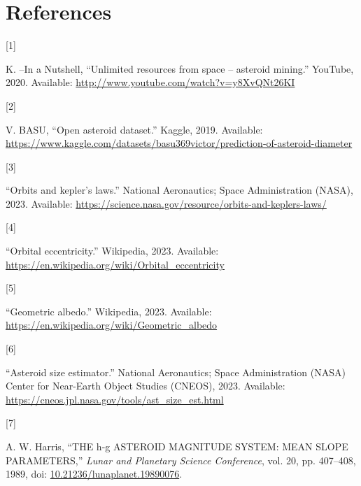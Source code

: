 \documentclass[
]{article}
\newlength{\cslhangindent}
\newlength{\csllabelwidth}
\newlength{\cslentryspacingunit} %
\newenvironment{CSLReferences}[2] %
 {%
  \setlength{\parindent}{0pt}
  \ifodd #1
  \let\oldpar\par
  \def\par{\hangindent=\cslhangindent\oldpar}
  \fi
  \setlength{\parskip}{#2\cslentryspacingunit}
 }%
 {}
\newcommand{\CSLLeftMargin}[1]{\parbox[t]{\csllabelwidth}{#1}}
\newcommand{\CSLRightInline}[1]{\parbox[t]{\linewidth - \csllabelwidth}{#1}\break}
\begin{document}
\hypertarget{references}{%
\section*{References}\label{references}}

\hypertarget{refs}{}
\begin{CSLReferences}{0}{0}
\leavevmode{}%
\CSLLeftMargin{{[}1{]} }%
\CSLRightInline{K. --In a Nutshell, {``Unlimited resources from space --
asteroid mining.''} YouTube, 2020. Available:
\url{http://www.youtube.com/watch?v=y8XvQNt26KI}}

\leavevmode{}%
\CSLLeftMargin{{[}2{]} }%
\CSLRightInline{V. BASU, {``Open asteroid dataset.''} Kaggle, 2019.
Available:
\url{https://www.kaggle.com/datasets/basu369victor/prediction-of-asteroid-diameter}}

\leavevmode{}%
\CSLLeftMargin{{[}3{]} }%
\CSLRightInline{{``Orbits and kepler's laws.''} National Aeronautics;
Space Administration (NASA), 2023. Available:
\url{https://science.nasa.gov/resource/orbits-and-keplers-laws/}}

\leavevmode{}%
\CSLLeftMargin{{[}4{]} }%
\CSLRightInline{{``Orbital eccentricity.''} Wikipedia, 2023. Available:
\url{https://en.wikipedia.org/wiki/Orbital_eccentricity}}

\leavevmode{}%
\CSLLeftMargin{{[}5{]} }%
\CSLRightInline{{``Geometric albedo.''} Wikipedia, 2023. Available:
\url{https://en.wikipedia.org/wiki/Geometric_albedo}}

\leavevmode{}%
\CSLLeftMargin{{[}6{]} }%
\CSLRightInline{{``Asteroid size estimator.''} National Aeronautics;
Space Administration (NASA) Center for Near-Earth Object Studies
(CNEOS), 2023. Available:
\url{https://cneos.jpl.nasa.gov/tools/ast_size_est.html}}

\leavevmode{}%
\CSLLeftMargin{{[}7{]} }%
\CSLRightInline{A. W. Harris, {``THE h-g ASTEROID MAGNITUDE SYSTEM: MEAN
SLOPE PARAMETERS,''} \emph{Lunar and Planetary Science Conference}, vol.
20, pp. 407--408, 1989, doi:
\href{https://doi.org/10.21236/lunaplanet.19890076}{10.21236/lunaplanet.19890076}.}


\end{CSLReferences}
\end{document}
